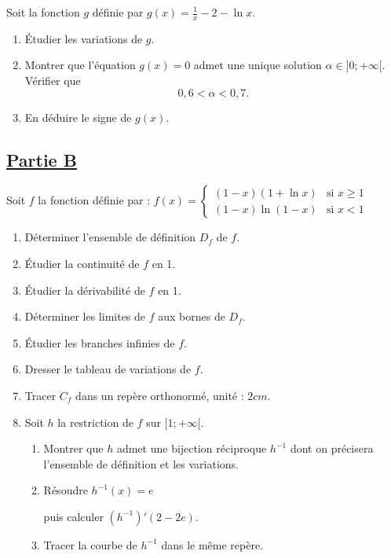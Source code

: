 Soit la fonction \( g \) définie par  \( g(x) = \frac{1}{x} - 2 - \ln x. \)

\begin{enumerate}
    \item Étudier les variations de \( g \).
    \item Montrer que l’équation \( g(x) = 0 \) admet une unique solution \( \alpha \in ]0; +\infty[ \). Vérifier que
          \[
              0,6 < \alpha < 0,7.
          \]
    \item En déduire le signe de \( g(x) \).
\end{enumerate}

\subsection*{\underline{\textbf{Partie B}}}

Soit \( f \) la fonction définie par :
\(
f(x) =
\begin{cases}
    (1 - x)(1 + \ln x) & \text{si } x \geq 1 \\
    (1 - x) \ln(1 - x) & \text{si } x < 1
\end{cases}
\)

\begin{enumerate}
    \item Déterminer l’ensemble de définition \( D_f \) de \( f \).
    \item Étudier la continuité de \( f \) en 1.
    \item Étudier la dérivabilité de \( f \) en 1.
    \item Déterminer les limites de \( f \) aux bornes de \( D_f \).
    \item Étudier les branches infinies de \( f \).
    \item Dresser le tableau de variations de \( f \).
    \item Tracer \( C_f \) dans un repère orthonormé, unité : \( 2cm \).
    \item Soit \( h \) la restriction de \( f \) sur \( [1; +\infty[ \).
          \begin{enumerate}
              \item Montrer que \( h \) admet une bijection réciproque \( h^{-1} \) dont on précisera l’ensemble de définition et les variations.
              \item Résoudre  \(  h^{-1}(x) = e \)

                    puis calculer  \(  (h^{-1})'(2 - 2e). \)

              \item Tracer la courbe de \( h^{-1} \) dans le même repère.
          \end{enumerate}
\end{enumerate}
